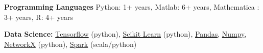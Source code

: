 \textbf{Programming Languages}
Python: 1+ years, Matlab: 6+ years, Mathematica : 3+ years, R: 4+
years



\textbf{Data Science:} \href{https://www.tensorflow.org/}{Tensorflow}
(python), \href{http://scikit-learn.org}{Scikit Learn} (python),
\href{http://pandas.pydata.org/}{Pandas},
\href{http://www.numpy.org/}{Numpy},
\href{https://networkx.github.io/}{NetworkX} (python),
\href{http://spark.apache.org/}{Spark} (scala/python)

